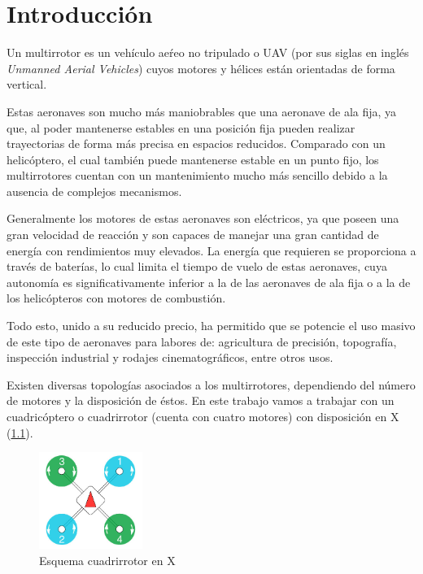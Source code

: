 \chapter{Introducción}

Un multirrotor es un vehículo aeŕeo no tripulado o UAV (por sus siglas en inglés \textit{Unmanned Aerial Vehicles}) cuyos motores y hélices están orientadas de forma vertical. 

Estas aeronaves son mucho más maniobrables que una aeronave de ala fija, ya que, al poder mantenerse estables en una posición fija pueden realizar trayectorias de forma más precisa en espacios reducidos. Comparado con un helicóptero, el cual también puede mantenerse estable en un punto fijo, los multirrotores cuentan con un mantenimiento mucho más sencillo debido a la ausencia de complejos mecanismos.

Generalmente los motores de estas aeronaves son eléctricos, ya que poseen una gran velocidad de reacción y son capaces de manejar una gran cantidad de energía con rendimientos muy elevados. La energía que requieren se proporciona a través de baterías, lo cual limita el tiempo de vuelo de estas aeronaves, cuya autonomía es significativamente inferior a la de las aeronaves de ala fija o a la de los helicópteros con motores de combustión.

Todo esto, unido a su reducido precio, ha permitido que se potencie el uso masivo de este tipo de aeronaves para labores de: agricultura de precisión, topografía, inspección industrial y rodajes cinematográficos, entre otros usos.

Existen diversas topologías asociados a los multirrotores, dependiendo del número de motores y la disposición de éstos. En este trabajo vamos a trabajar con un cuadricóptero o cuadrirrotor (cuenta con cuatro motores) con disposición en X (\cref{Drone_en_X}).

\begin{figure}[htb!]
		\centering
		\includegraphics[width=0.3\textwidth]{introduccion/cuadrirrotorX.jpeg}
		\caption{Esquema cuadrirrotor en X}
		\label{Drone_en_X}
	\end{figure}

